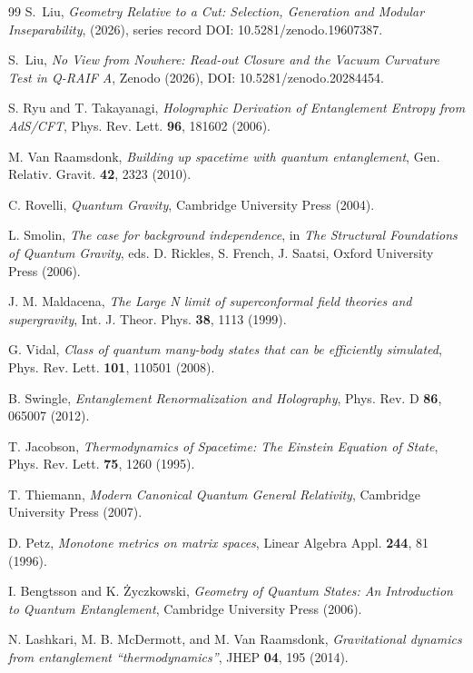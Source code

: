 \documentclass[12pt,a4paper]{article}
\begin{document}
\begin{thebibliography}{99}
S.~Liu, \emph{Geometry Relative to a Cut: Selection, Generation and Modular Inseparability}, (2026), series record DOI: 10.5281/zenodo.19607387.

S.~Liu, \emph{No View from Nowhere: Read-out Closure and the Vacuum Curvature Test in Q-RAIF A}, Zenodo (2026), DOI: 10.5281/zenodo.20284454.

S. Ryu and T. Takayanagi, \emph{Holographic Derivation of Entanglement Entropy from AdS/CFT}, Phys. Rev. Lett. \textbf{96}, 181602 (2006).

M. Van Raamsdonk, \emph{Building up spacetime with quantum entanglement}, Gen. Relativ. Gravit. \textbf{42}, 2323 (2010).

C. Rovelli, \emph{Quantum Gravity}, Cambridge University Press (2004).

L. Smolin, \emph{The case for background independence}, in \emph{The Structural Foundations of Quantum Gravity}, eds. D. Rickles, S. French, J. Saatsi, Oxford University Press (2006).

J. M. Maldacena, \emph{The Large N limit of superconformal field theories and supergravity}, Int. J. Theor. Phys. \textbf{38}, 1113 (1999).

G. Vidal, \emph{Class of quantum many-body states that can be efficiently simulated}, Phys. Rev. Lett. \textbf{101}, 110501 (2008).

B. Swingle, \emph{Entanglement Renormalization and Holography}, Phys. Rev. D \textbf{86}, 065007 (2012).

T. Jacobson, \emph{Thermodynamics of Spacetime: The Einstein Equation of State}, Phys. Rev. Lett. \textbf{75}, 1260 (1995).

T. Thiemann, \emph{Modern Canonical Quantum General Relativity}, Cambridge University Press (2007).

D. Petz, \emph{Monotone metrics on matrix spaces}, Linear Algebra Appl. \textbf{244}, 81 (1996).

I. Bengtsson and K. \.Zyczkowski, \emph{Geometry of Quantum States: An Introduction to Quantum Entanglement}, Cambridge University Press (2006).

N. Lashkari, M. B. McDermott, and M. Van Raamsdonk, \emph{Gravitational dynamics from entanglement ``thermodynamics''}, JHEP \textbf{04}, 195 (2014).


\end{thebibliography}
\end{document}
